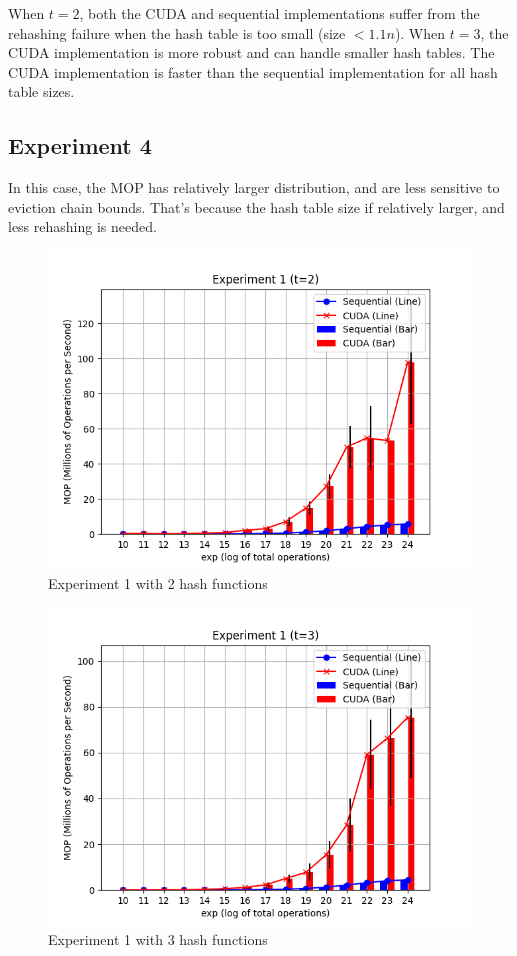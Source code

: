 \documentclass{article}
\begin{document}
When $t=2$, both the CUDA and sequential implementations suffer from the rehashing failure when the hash table is too small (size $< 1.1n$). When $t=3$, the CUDA implementation is more robust and can handle smaller hash tables. The CUDA implementation is faster than the sequential implementation for all hash table sizes.

\subsection{Experiment 4}

In this case, the MOP has relatively larger distribution, and are less sensitive to eviction chain bounds. That's because the hash table size if relatively larger, and less rehashing is needed.

\begin{figure}[h!]
    \centering
    \includegraphics[width=\textwidth]{../figs/experiment1_t2.png}
    \caption{Experiment 1 with 2 hash functions}
\end{figure}

\begin{figure}[h!]
    \centering
    \includegraphics[width=\textwidth]{../figs/experiment1_t3.png}
    \caption{Experiment 1 with 3 hash functions}
\end{figure}
\end{document}
